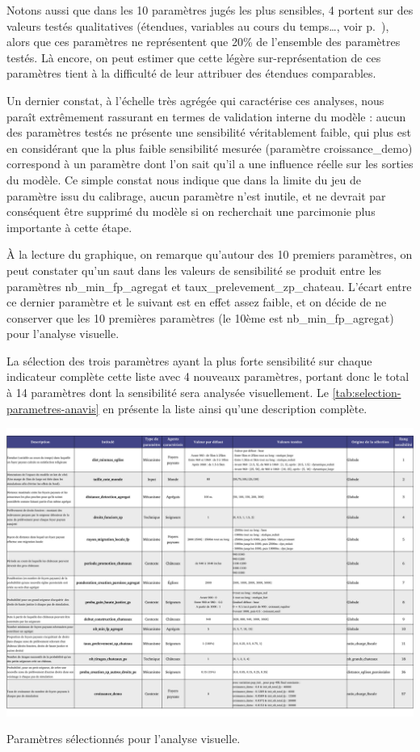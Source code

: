 Notons aussi que dans les 10 paramètres jugés les plus sensibles, 4 portent sur des valeurs testés \og qualitatives\fg{} (étendues, variables au cours du temps\ldots, voir p.~\pageref{par:etendue-parametres}), alors que ces paramètres ne représentent que 20\% de l'ensemble des paramètres testés.
Là encore, on peut estimer que cette légère sur-représentation de ces paramètres tient à la difficulté de leur attribuer des étendues comparables.

Un dernier constat, à l'échelle très agrégée qui caractérise ces analyses, nous paraît extrêmement rassurant en termes de validation interne du modèle : aucun des paramètres testés ne présente une sensibilité véritablement faible, qui plus est en considérant que la plus faible sensibilité mesurée (paramètre \textsf{croissance\_demo}) correspond à un paramètre dont l'on sait qu'il a une influence réelle sur les sorties du modèle.
Ce simple constat nous indique que dans la limite du jeu de paramètre issu du calibrage, aucun paramètre n'est inutile, et ne devrait par conséquent être supprimé du modèle si on recherchait une parcimonie plus importante à cette étape.



À la lecture du graphique, on remarque qu'autour des 10 premiers paramètres, on peut constater qu'un \og saut\fg{} dans les valeurs de sensibilité se produit entre les paramètres \textsf{nb\_min\_fp\_agregat} et \textsf{taux\_prelevement\_zp\_chateau}.
L'écart entre ce dernier paramètre et le suivant est en effet assez faible, et on décide de ne conserver que les 10 premières paramètres (le 10ème est \textsf{nb\_min\_fp\_agregat}) pour l'analyse visuelle.

La sélection des trois paramètres ayant la plus forte sensibilité sur chaque indicateur complète cette liste avec 4 nouveaux paramètres, portant donc le total à 14 paramètres dont la sensibilité sera analysée visuellement.
Le \cref{tab:selection-parametres-anavis} en présente la liste ainsi qu'une description complète.

\clearpage
\begin{table}[H]
\includegraphics[width=1.75\linewidth, angle=90, origin=c]{img/Parametres.pdf}
\caption{Paramètres sélectionnés pour l'analyse visuelle.}
\label{tab:selection-parametres-anavis}
\end{table}

